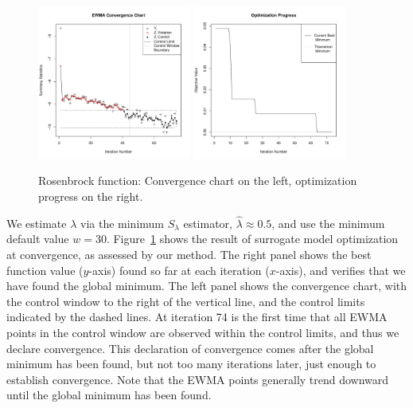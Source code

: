 \documentclass[12pt]{article}
\def \roseLamb {
        0.5     
}
\begin{document}
\begin{figure}[htb]
  \includegraphics[width=0.45\textwidth]{./figures/ewmaConvChartRoseEasyEasyBW.pdf}
  \includegraphics[width=0.45\textwidth]{./figures/bestZRoseEasyEasyEnd.pdf}
  \caption{Rosenbrock function: Convergence chart on the left, optimization progress on the right.}
\label{fig:rosenbrock}
\end{figure}
We estimate $\lambda$ via the minimum $S_\lambda$ estimator, $\hat\lambda\approx\roseLamb$, and use the minimum default value $w=30$.
%
Figure~\ref{fig:rosenbrock} shows the result of surrogate model optimization at convergence, as assessed by our method.  
%
The right panel shows the best function value ($y$-axis) found so far at each iteration ($x$-axis), and verifies that we have found the global minimum.
%
The left panel shows the convergence chart, with the control window to the right of the vertical line, and the control limits indicated by the dashed lines.
%
At iteration 74 is the first time that all EWMA points in the control window are observed within the control limits, and thus we declare convergence.  This declaration of convergence comes after the global minimum has been found, but not too many iterations later, just enough to establish convergence.
%
Note that the EWMA points generally trend downward until the global minimum has been found.  
\end{document}
